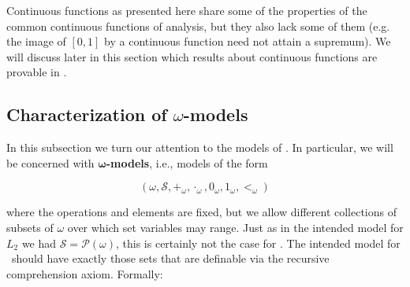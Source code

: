 \documentclass[../main.tex]{memoir}
\begin{document}
Continuous functions as presented here share some of the properties of the common continuous functions of analysis, but they also lack some of them (e.g. the image of $[0, 1]$ by a continuous function need not attain a supremum). We will discuss later in this section which results about continuous functions are provable in \rca.

\subsection{Characterization of $\omega$-models}

In this subsection we turn our attention to the models of \rca. In particular, we will be concerned with $\mathbf{\omega}$\textbf{-models}, i.e., models of the form

\[ (\omega, \mathcal{S}, +_{\omega}, \cdot_{\omega}, 0_{\omega}, 1_{\omega}, <_{\omega}) \]

where the operations and elements are fixed, but we allow different collections of subsets of $\omega$ over which set variables may range. Just as in the intended model for $L_2$ we had $\mathcal{S} = \mathcal{P}(\omega)$, this is certainly not the case for \rca. The intended model for \rca\ should have exactly those sets that are definable via the recursive comprehension axiom. Formally:
\end{document}
